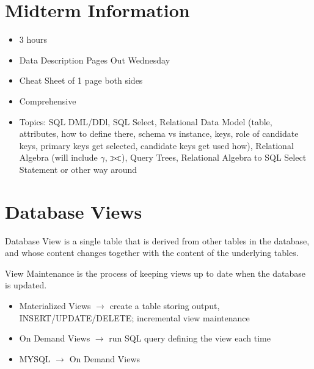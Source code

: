 \documentclass[twoside]{article}
\def\ojoin{\setbox0=\hbox{$\bowtie$}%
  \rule[-.02ex]{.25em}{.4pt}\llap{\rule[\ht0]{.25em}{.4pt}}}
\def\fullouterjoin{\mathbin{\ojoin\mkern-5.8mu\bowtie\mkern-5.8mu\ojoin}}
\begin{document}
\section*{Midterm Information}
\begin{itemize}
    \item 3 hours
    \item Data Description Pages Out Wednesday
    \item Cheat Sheet of 1 page both sides
    \item Comprehensive
    \item Topics: SQL DML/DDl, SQL Select, Relational Data Model (table, 
    attributes, how to define there, schema vs instance, keys, role of 
    candidate keys, primary keys get selected, candidate keys get used how),
    Relational Algebra (will include $\gamma$, $\fullouterjoin$), Query Trees,
    Relational Algebra to SQL Select Statement or other way around
\end{itemize}

\section*{Database Views}
Database View is a single table that is derived from other tables in the
database, and whose content changes together with the content of the underlying
tables.

View Maintenance is the process of keeping views up to date when the database
is updated.
\begin{itemize}
    \item Materialized Views $\longrightarrow$ create a table storing output,
    INSERT/UPDATE/DELETE; incremental view maintenance
    \item On Demand Views $\longrightarrow$ run SQL query defining the view each
    time
    \item MYSQL $\longrightarrow$ On Demand Views
\end{itemize}
\end{document}
